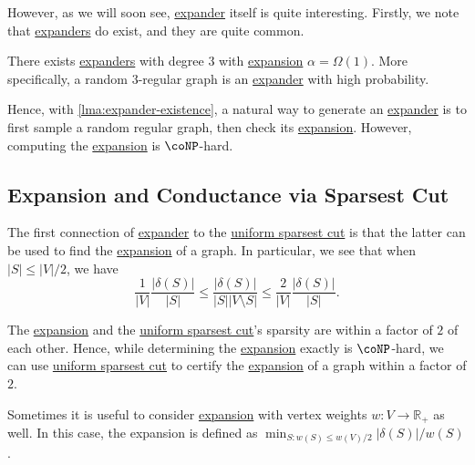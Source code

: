 However, as we will soon see, \hyperref[def:expander]{expander} itself is quite interesting. Firstly, we note that \hyperref[def:expander]{expanders} do exist, and they are quite common.

\begin{lemma}\label{lma:expander-existence}
	There exists \hyperref[def:expander]{expanders} with degree \(3\) with \hyperref[def:expansion]{expansion} \(\alpha = \Omega (1)\). More specifically, a random \(3\)-regular graph is an \hyperref[def:expander]{expander} with high probability.
\end{lemma}

Hence, with \autoref{lma:expander-existence}, a natural way to generate an \hyperref[def:expander]{expander} is to first sample a random regular graph, then check its \hyperref[def:expansion]{expansion}. However, computing the \hyperref[def:expansion]{expansion} is \(\coNP\)-hard.

\subsection{Expansion and Conductance via Sparsest Cut}
The first connection of \hyperref[def:expander]{expander} to the \hyperref[prb:sparsest-cut]{uniform sparsest cut} is that the latter can be used to find the \hyperref[def:expansion]{expansion} of a graph. In particular, we see that when \(\lvert S \rvert \leq \lvert V \rvert / 2\), we have
\[
	\frac{1}{\lvert V \rvert } \frac{\lvert \delta (S) \rvert }{\lvert S \rvert }
	\leq \frac{\lvert \delta (S) \rvert }{\lvert S \rvert \lvert V \setminus S \rvert }
	\leq \frac{2}{\lvert V \rvert } \frac{\lvert \delta (S) \rvert }{\lvert S \rvert }.
\]

\begin{remark}
	The \hyperref[def:expansion]{expansion} and the \hyperref[prb:sparsest-cut]{uniform sparsest cut}'s sparsity are within a factor of \(2\) of each other. Hence, while determining the \hyperref[def:expansion]{expansion} exactly is \(\coNP\)-hard, we can use \hyperref[prb:sparsest-cut]{uniform sparsest cut} to certify the \hyperref[def:expansion]{expansion} of a graph within a factor of \(2\).
\end{remark}

Sometimes it is useful to consider \hyperref[def:expansion]{expansion} with vertex weights \(w \colon V \to \mathbb{R} _+\) as well. In this case, the expansion is defined as \(\min _{S \colon w(S) \leq w(V) / 2} \lvert \delta (S) \rvert / w(S)\).

